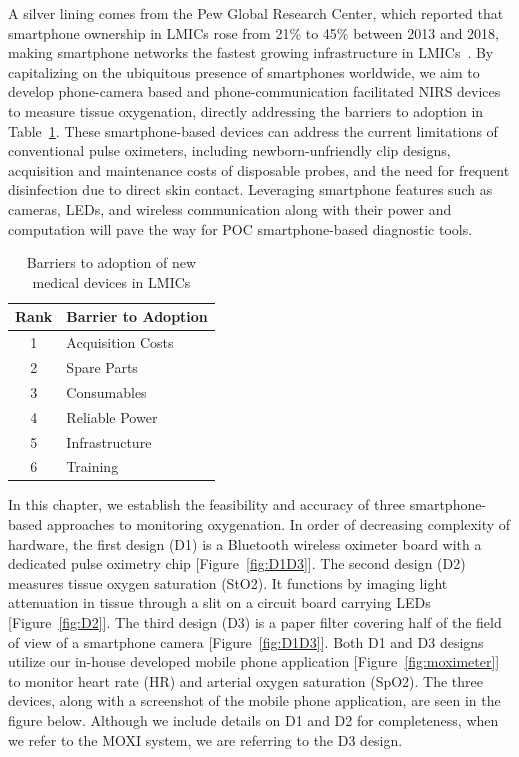 A silver lining comes from the Pew Global Research Center, which reported that smartphone ownership in \ac{LMIC}s rose from 21\% to 45\% between 2013 and 2018, making smartphone networks the fastest growing infrastructure in LMICs~\cite{Poushter2016}. By capitalizing on the ubiquitous presence of smartphones worldwide, we aim to develop phone-camera based and phone-communication facilitated NIRS devices to measure tissue oxygenation, directly addressing the barriers to adoption in Table~\ref{tab:lmicbarriers}. These smartphone-based devices can address the current limitations of conventional pulse oximeters, including newborn-unfriendly clip designs, acquisition and maintenance costs of disposable probes, and the need for frequent disinfection due to direct skin contact. Leveraging smartphone features such as cameras, LEDs, and wireless communication along with their power and computation will pave the way for POC smartphone-based diagnostic tools. 

\begin{table}[]
\centering
\caption{Barriers to adoption of new medical devices in LMICs}
\label{tab:lmicbarriers}
\begin{tabular}{@{}cl@{}}
\toprule
Rank & Barrier to Adoption \\ \midrule
1    & Acquisition Costs   \\
2    & Spare Parts         \\
3    & Consumables         \\
4    & Reliable Power      \\
5    & Infrastructure      \\
6    & Training            \\ \bottomrule
\end{tabular}
\end{table}

In this chapter, we establish the feasibility and accuracy of three smartphone-based approaches to monitoring oxygenation. In order of decreasing complexity of hardware, the first design (D1) is a Bluetooth wireless oximeter board with a dedicated pulse oximetry chip [Figure~\ref{fig:D1D3}]. The second design (D2) measures tissue oxygen saturation (StO2). It functions by imaging light attenuation in tissue through a slit on a circuit board carrying LEDs [Figure~\ref{fig:D2}]. The third design (D3) is a paper filter covering half of the field of view of a smartphone camera [Figure~\ref{fig:D1D3}]. Both D1 and D3 designs utilize our in-house developed mobile phone application [Figure~\ref{fig:moximeter}] to monitor heart rate (HR) and arterial oxygen saturation (SpO2). The three devices, along with a screenshot of the mobile phone application, are seen in the figure below. Although we include details on D1 and D2 for completeness, when we refer to the \ac{MOXI} system, we are referring to the D3 design. 

